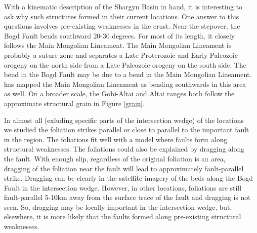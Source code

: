 	With a kinematic description of the Shargyn Basin in hand, it is interesting to ask why such structures formed in their current locations. One answer to this questions involves pre-existing weaknesses in the crust. Near the stepover, the Bogd Fault bends southward 20-30 degrees. For most of its length, it closely follows the Main Mongolian Lineament. The Main Mongolian Lineament is probably a suture zone and separates a Late Proterozoic and Early Paleozoic orogeny on the north side from a Late Paleozoic orogeny on the south side. The bend in the Bogd Fault may be due to a bend in the Main Mongolian Lineament. \citet{Windley2007} has mapped the Main Mongolian Lineament as bending southwards in this area as well. On a broader scale, the Gobi-Altai and Altai ranges both follow the approximate structural grain in Figure \ref{grain}.
	
	In almost all (exluding specific parts of the intersection wedge) of the locations we studied the foliation strikes parallel or close to parallel to the important fault in the region. The foliations fit well with a model where faults form along structural weaknesses. The foliations could also be explained by dragging along the fault. With enough slip, regardless of the original foliation is an area, dragging of the foliation near the fault will lead to approximately fault-parallel strike. Dragging can be clearly in the satellite imagery of the beds along the Bogd Fault in the intersection wedge. However, in other locations, foliations are still fault-parallel 5-10km away from the surface trace of the fault and dragging is not seen. So, dragging may be locally important in the intersection wedge, but, elsewhere, it is more likely that the faults formed along pre-existing structural weaknesses.
